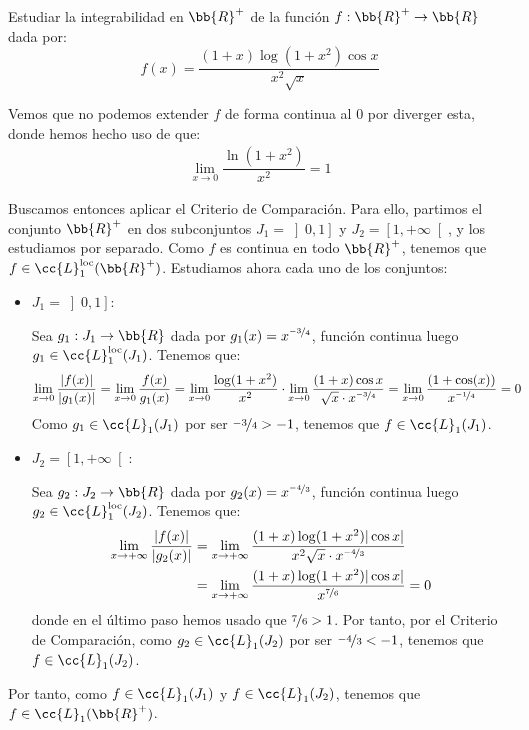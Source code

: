 \begin{ejercicio}
    Estudiar la integrabilidad en $\bb{R}^+$ de la función $f:\bb{R}^+\to \bb{R}$ dada por:
    \begin{equation*}
        f(x) = \dfrac{(1+x)\log(1+x^2)\cos x}{x^2\sqrt{x}}
    \end{equation*}

    Vemos que no podemos extender $f$ de forma continua al $0$ por diverger esta, donde hemos hecho uso de que:
    \begin{align*}
        \lim_{x\to 0} \dfrac{\ln(1+x^2)}{x^2}=1
    \end{align*}

    Buscamos entonces aplicar el Criterio de Comparación. Para ello, partimos el conjunto $\bb{R}^+$ en dos subconjuntos $J_1=\left]0,1\right]$ y $J_2=\left[1,+\infty\right[$, y los estudiamos por separado.
    Como $f$ es continua en todo $\bb{R}^+$, tenemos que $f\in \cc{L}_1^{\text{loc}}(\bb{R}^+)$. Estudiamos ahora cada uno de los conjuntos:
    \begin{itemize}
        \item \ul{$J_1=\left]0,1\right]$}:
        
        Sea $g_1:J_1\to \bb{R}$ dada por $g_1(x)=x^{\nicefrac{-3}{4}}$, función continua luego $g_1\in \cc{L}_1^{\text{loc}}(J_1)$. Tenemos que:
        \begin{align*}
            \lim_{x\to 0} \dfrac{|f(x)|}{|g_1(x)|}
            &= \lim_{x\to 0} \dfrac{f(x)}{g_1(x)}
            = \lim_{x\to 0}\dfrac{\log(1+x^2)}{x^2}\cdot
            \lim_{x\to 0}\dfrac{(1+x)\cos x}{\sqrt{x}\cdot x^{\nicefrac{-3}{4}}}
            = \lim_{x\to 0}\dfrac{(1+\cos(x))}{x^{\nicefrac{-1}{4}}} = 0
        \end{align*}
        Como $g_1\in \cc{L}_1(J_1)$ por ser $\nicefrac{-3}{4}>-1$, tenemos que $f\in \cc{L}_1(J_1)$.

        \item \ul{$J_2=\left[1,+\infty\right[$}:
        
        Sea $g_2:J_2\to \bb{R}$ dada por $g_2(x)=x^{\nicefrac{-4}{3}}$, función continua luego $g_2\in \cc{L}_1^{\text{loc}}(J_2)$. Tenemos que:
        \begin{align*}
            \lim_{x\to +\infty} \dfrac{|f(x)|}{|g_2(x)|}
            &= \lim_{x\to +\infty}\dfrac{(1+x)\log(1+x^2)|\cos x|}{x^2\sqrt{x}\cdot x^{\nicefrac{-4}{3}}}\\
            &= \lim_{x\to +\infty}\dfrac{(1+x)\log(1+x^2)|\cos x|}{x^{\nicefrac{7}{6}}}=0
        \end{align*}
        donde en el último paso hemos usado que $\nicefrac{7}{6}>1$. Por tanto, por el Criterio de Comparación, como $g_2\in \cc{L}_1(J_2)$ por ser $\nicefrac{-4}{3}<-1$, tenemos que $f\in \cc{L}_1(J_2)$.
    \end{itemize}

    Por tanto, como $f\in \cc{L}_1(J_1)$ y $f\in \cc{L}_1(J_2)$, tenemos que $f\in \cc{L}_1(\bb{R}^+)$.
\end{ejercicio}


